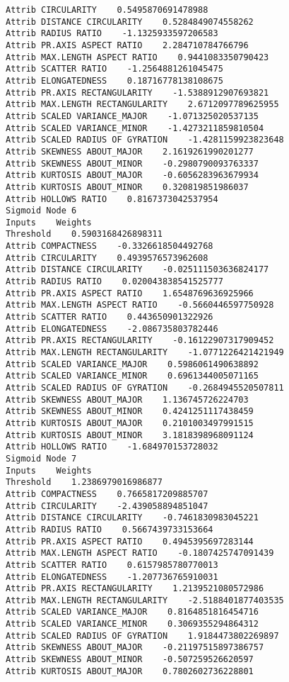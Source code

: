 \documentclass[
	article,			%
	11pt,				%
	oneside,			%
	a4paper,			%
	english,			%
	brazil,				%
	sumario=tradicional
	]{abntex2}
\begin{document}
\begin{lstlisting}
Attrib CIRCULARITY    0.5495870691478988
Attrib DISTANCE CIRCULARITY    0.5284849074558262
Attrib RADIUS RATIO    -1.1325933597206583
Attrib PR.AXIS ASPECT RATIO    2.284710784766796
Attrib MAX.LENGTH ASPECT RATIO    0.9441083350790423
Attrib SCATTER RATIO    -1.2564881261045475
Attrib ELONGATEDNESS    0.18716778138108675
Attrib PR.AXIS RECTANGULARITY    -1.5388912907693821
Attrib MAX.LENGTH RECTANGULARITY    2.6712097789625955
Attrib SCALED VARIANCE_MAJOR    -1.071325020537135
Attrib SCALED VARIANCE_MINOR    -1.4273211859810504
Attrib SCALED RADIUS OF GYRATION    -1.4281159923823648
Attrib SKEWNESS ABOUT_MAJOR    2.1619261990201277
Attrib SKEWNESS ABOUT_MINOR    -0.2980790093763337
Attrib KURTOSIS ABOUT_MAJOR    -0.6056283963679934
Attrib KURTOSIS ABOUT_MINOR    0.320819851986037
Attrib HOLLOWS RATIO    0.8167373042537954
Sigmoid Node 6
Inputs    Weights
Threshold    0.5903168426898311
Attrib COMPACTNESS    -0.3326618504492768
Attrib CIRCULARITY    0.4939576573962608
Attrib DISTANCE CIRCULARITY    -0.025111503636824177
Attrib RADIUS RATIO    0.020043838541525777
Attrib PR.AXIS ASPECT RATIO    1.6548769636925966
Attrib MAX.LENGTH ASPECT RATIO    -0.5660446597750928
Attrib SCATTER RATIO    0.443650901322926
Attrib ELONGATEDNESS    -2.086735803782446
Attrib PR.AXIS RECTANGULARITY    -0.16122907317909452
Attrib MAX.LENGTH RECTANGULARITY    -1.0771226421421949
Attrib SCALED VARIANCE_MAJOR    0.5986061490638892
Attrib SCALED VARIANCE_MINOR    0.6961344005071165
Attrib SCALED RADIUS OF GYRATION    -0.2684945520507811
Attrib SKEWNESS ABOUT_MAJOR    1.136745726224703
Attrib SKEWNESS ABOUT_MINOR    0.4241251117438459
Attrib KURTOSIS ABOUT_MAJOR    0.2101003497991515
Attrib KURTOSIS ABOUT_MINOR    3.1818398968091124
Attrib HOLLOWS RATIO    -1.684970153728032
Sigmoid Node 7
Inputs    Weights
Threshold    1.2386979016986877
Attrib COMPACTNESS    0.7665817209885707
Attrib CIRCULARITY    -2.439058894851047
Attrib DISTANCE CIRCULARITY    -0.7461830983045221
Attrib RADIUS RATIO    0.5667439733153664
Attrib PR.AXIS ASPECT RATIO    0.4945395697283144
Attrib MAX.LENGTH ASPECT RATIO    -0.1807425747091439
Attrib SCATTER RATIO    0.6157985780770013
Attrib ELONGATEDNESS    -1.207736765910031
Attrib PR.AXIS RECTANGULARITY    1.2139521080572986
Attrib MAX.LENGTH RECTANGULARITY    -2.5188401877403535
Attrib SCALED VARIANCE_MAJOR    0.8164851816454716
Attrib SCALED VARIANCE_MINOR    0.3069355294864312
Attrib SCALED RADIUS OF GYRATION    1.9184473802269897
Attrib SKEWNESS ABOUT_MAJOR    -0.21197515897386757
Attrib SKEWNESS ABOUT_MINOR    -0.507259526620597
Attrib KURTOSIS ABOUT_MAJOR    0.7802602736228801

\end{lstlisting}
\end{document}
